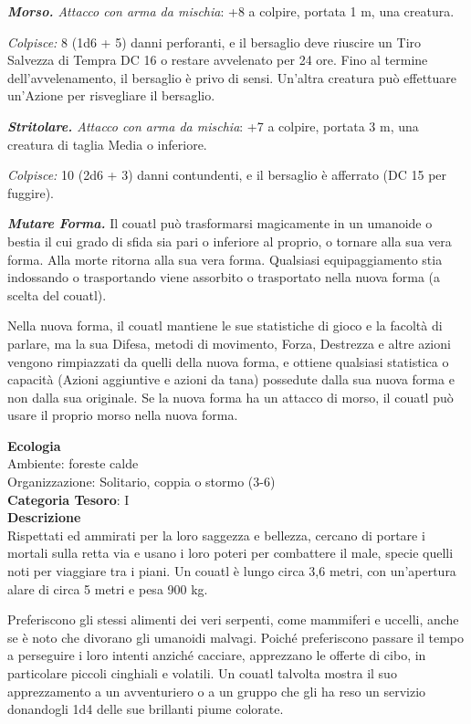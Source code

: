 \begin{multicols}{2}
{\emph{\textbf{Morso.} Attacco con arma da mischia}: +8 a colpire, portata 1 m, una creatura.

\emph{Colpisce:} 8 (1d6 + 5) danni perforanti, e il bersaglio deve riuscire un Tiro Salvezza di Tempra DC 16 o restare avvelenato per 24 ore. Fino al termine dell'avvelenamento, il bersaglio è privo di sensi. Un'altra creatura può effettuare un'Azione per risvegliare il bersaglio.

\emph{\textbf{Stritolare.} Attacco con arma da mischia}: +7 a colpire, portata 3 m, una creatura di taglia Media o inferiore.

\emph{Colpisce:} 10 (2d6 + 3) danni contundenti, e il bersaglio è afferrato (DC 15 per fuggire).

\emph{\textbf{Mutare Forma.}} Il couatl può trasformarsi magicamente in un umanoide o bestia il cui grado di sfida sia pari o inferiore al proprio, o tornare alla sua vera forma. Alla morte ritorna alla sua vera forma. Qualsiasi equipaggiamento stia indossando o trasportando viene assorbito o trasportato nella nuova forma (a scelta del couatl).

Nella nuova forma, il couatl mantiene le sue statistiche di gioco e la facoltà di parlare, ma la sua Difesa, metodi di movimento, Forza, Destrezza e altre azioni vengono rimpiazzati da quelli della nuova forma, e ottiene qualsiasi statistica o capacità (Azioni aggiuntive e azioni da tana) possedute dalla sua nuova forma e non dalla sua originale. Se la nuova forma ha un attacco di morso, il couatl può usare il proprio morso nella nuova forma.

\textbf{Ecologia}\\
Ambiente: foreste calde\\
Organizzazione: Solitario, coppia o stormo (3-6)\\
\textbf{Categoria Tesoro}: I\\
\textbf{Descrizione}\\
Rispettati ed ammirati per la loro saggezza e bellezza, cercano di portare i mortali sulla retta via e usano i loro poteri per combattere il male, specie quelli noti per viaggiare tra i piani. Un couatl è lungo circa 3,6 metri, con un'apertura alare di circa 5 metri e pesa 900 kg.

Preferiscono gli stessi alimenti dei veri serpenti, come mammiferi e uccelli, anche se è noto che divorano gli umanoidi malvagi. Poiché preferiscono passare il tempo a perseguire i loro intenti anziché cacciare, apprezzano le offerte di cibo, in particolare piccoli cinghiali e volatili. Un couatl talvolta mostra il suo apprezzamento a un avventuriero o a un gruppo che gli ha reso un servizio donandogli 1d4 delle sue brillanti piume colorate.

}
\end{multicols}
